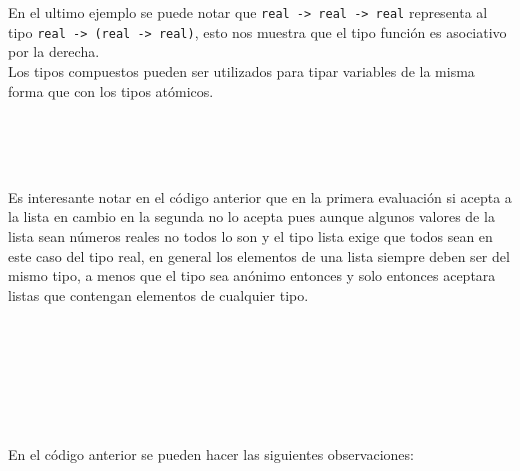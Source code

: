       En el ultimo ejemplo se puede notar que \texttt{real ->~real ->~real} representa al tipo \texttt{real ->~(real ->~real)}, esto nos muestra que el tipo función es asociativo por la derecha.
      \\
      
      Los tipos compuestos pueden ser utilizados para tipar variables de la misma forma que con los tipos atómicos.
      
      \begin{fxcode}
          \\
         \\
         \\
      \end{fxcode}
      
      Es interesante notar en el código anterior que en la primera evaluación si acepta a la lista en cambio en la segunda no lo acepta pues aunque algunos valores de la lista sean números reales no todos lo son y el tipo lista exige que todos sean en este caso del tipo real, en general los elementos de una lista siempre deben ser del mismo tipo, a menos que el tipo sea anónimo entonces y solo entonces aceptara listas que contengan elementos de cualquier tipo.
      
      \begin{fxcode}
         \\
      \end{fxcode}
      
      \begin{fxcode}
         \\
         \\
         \\
         \
         \\
         \outcode{0.841470984807897}
      \end{fxcode}
      
      En el código anterior se pueden hacer las siguientes observaciones:
      
